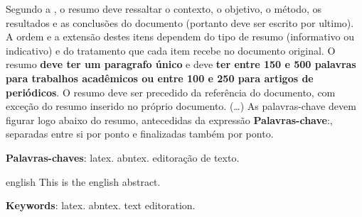 
\setlength{\absparsep}{18pt} %
\begin{resumo}

 Segundo a , o resumo deve ressaltar o contexto, o objetivo, o método, os resultados e as conclusões do documento (portanto deve ser escrito por ultimo). A ordem e a extensão destes itens dependem do tipo de resumo (informativo ou indicativo) e do  tratamento que cada item recebe no documento original. O resumo \textbf{deve ter um paragrafo único} e deve \textbf{ter entre 150 e 500 palavras para trabalhos acadêmicos ou entre 100 e 250 para artigos de periódicos}. O resumo deve ser  precedido da referência do documento, com exceção do resumo inserido no  próprio documento. (\ldots) As palavras-chave devem figurar logo abaixo do resumo, antecedidas da expressão \textbf{Palavras-chave}:, separadas entre si por ponto e finalizadas também por ponto.

 \textbf{Palavras-chaves}: latex. abntex. editoração de texto.
\end{resumo}

\begin{resumo}[Abstract]
 \begin{otherlanguage*}{english}
   This is the english abstract.
   \vspace{\onelineskip}

   \noindent 
   \textbf{Keywords}: latex. abntex. text editoration.
 \end{otherlanguage*}
\end{resumo}